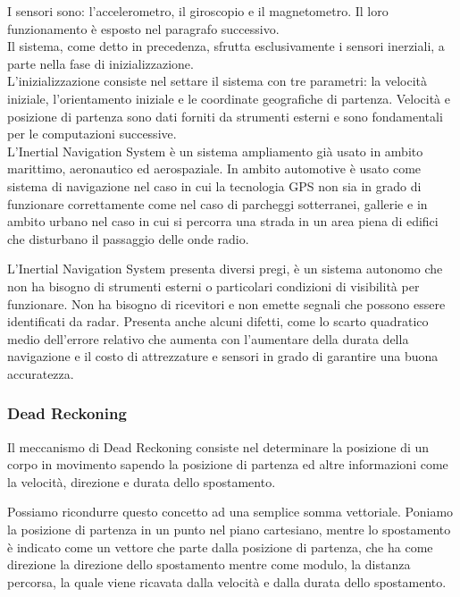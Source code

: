 \documentclass[12pt,a4paper,openright,twoside]{report}
\begin{document}
I sensori sono: l'accelerometro, il giroscopio e il magnetometro. Il loro funzionamento è esposto nel paragrafo successivo. \\

Il sistema, come detto in precedenza, sfrutta esclusivamente i sensori inerziali, a parte nella fase di inizializzazione.\\
L'inizializzazione consiste nel settare il sistema con tre parametri: la velocità iniziale, l'orientamento iniziale e le coordinate geografiche di partenza. Velocità e posizione di partenza sono dati forniti da strumenti esterni e sono fondamentali per le computazioni successive.\\

L'Inertial Navigation System è un sistema ampliamento già usato in ambito marittimo, aeronautico ed aerospaziale. 
In ambito automotive è usato come sistema di navigazione nel caso in cui la tecnologia GPS non sia in grado di funzionare correttamente come nel caso di parcheggi sotterranei, gallerie e in ambito urbano nel caso in cui si percorra una strada in un area piena di edifici che disturbano il passaggio delle onde radio.

L'Inertial Navigation System presenta diversi pregi, è un sistema autonomo che non ha bisogno di strumenti esterni o particolari condizioni di visibilità per funzionare. Non ha bisogno di ricevitori e non emette segnali che possono essere identificati da radar.
Presenta anche alcuni difetti, come lo scarto quadratico medio dell'errore relativo che aumenta con l'aumentare della durata della navigazione e il costo di attrezzature e sensori in grado di garantire una buona accuratezza.

\subsubsection{Dead Reckoning}
Il meccanismo di Dead Reckoning consiste nel determinare la posizione di un corpo in movimento sapendo la posizione di partenza ed altre informazioni come la velocità, direzione e durata dello spostamento.

Possiamo ricondurre questo concetto ad una semplice somma vettoriale. Poniamo la posizione di partenza in un punto nel piano cartesiano, mentre lo spostamento è indicato come un vettore che parte dalla posizione di partenza, che ha come direzione la direzione dello spostamento mentre come modulo, la distanza percorsa, la quale viene ricavata dalla velocità e dalla durata dello spostamento.
\end{document}
